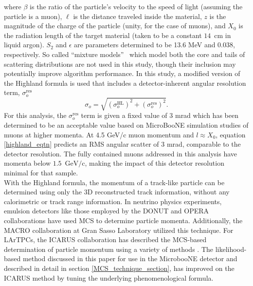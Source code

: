 \documentclass[a4paper,11pt]{article}
\begin{document}
\noindent where $\beta$ is the ratio of the particle's velocity to the speed of light (assuming the particle is a muon), $\ell$ is the distance traveled inside the material, $z$ is the magnitude of the charge of the particle (unity, for the case of muons), and $X_0$ is the radiation length of the target material (taken to be a constant $14$~cm in liquid argon). $S_2$ and $\epsilon$ are parameters determined to be 13.6 MeV and 0.038, respectively. So called ``mixture models''~\cite{mixmodel1,mixmodel2} which model both the core and tails of scattering distributions are not used in this study, though their inclusion may potentially improve algorithm performance. In this study, a modified version of the Highland formula is used that includes a detector-inherent angular resolution term, $\sigma_o^{\text{res}}$
\begin{equation}\label{modified_highland_eqtn}
\sigma_{o} = \sqrt{ (\sigma_o^{\text{HL}})^2 + (\sigma_o^{\text{res}})^2}.%
\end{equation}
For this analysis, the $\sigma_o^{\text{res}}$ term is given a fixed value of 3 mrad which has been determined to be an acceptable value based on MicroBooNE simulation studies of muons at higher momenta. At 4.5 GeV/c muon momentum and $l\approx X_0$, equation \ref{highland_eqtn} predicts an RMS angular scatter of 3 mrad, comparable to the detector resolution. The fully contained muons addressed in this analysis have momenta below $1.5$~$\text{GeV/c}$, making the impact of this detector resolution minimal for that sample.\\

With the Highland formula, the momentum of a track-like particle can be determined using only the 3D reconstructed track information, without any calorimetric or track range information. In neutrino physics experiments, emulsion detectors like those employed by the DONUT \cite{DONUT_paper} and OPERA \cite{OPERA_paper} collaborations have used MCS to determine particle momenta. Additionally, the MACRO \cite{MACRO_paper} collaboration at Gran Sasso Laboratory utilized this technique. For LArTPCs, the ICARUS collaboration has described the MCS-based determination of particle momentum using a variety of methods \cite{icarus_mcs_paper,new_icarus_paper}. The likelihood-based method discussed in this paper for use in the MicrobooNE detector and described in detail in section \ref{MCS_technique_section}, has improved on the ICARUS method by tuning the underlying phenomenological formula.
\end{document}
